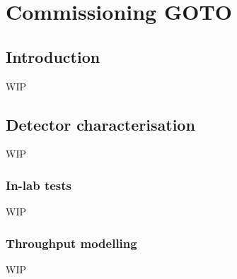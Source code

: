 \chapter{Commissioning GOTO}
\label{chap:commissioning}
\chaptoc{}


\newpage
\section{Introduction}
\label{sec:commissioning_intro}
\begin{colsection}


\begin{colsection}

WIP

\end{colsection}


\end{colsection}


\newpage
\section{Detector characterisation}
\label{sec:detectors}
\begin{colsection}


\begin{colsection}

WIP

\end{colsection}

\subsection{In-lab tests}
\label{sec:detector_tests}
\begin{colsection}

WIP

\end{colsection}

\subsection{Throughput modelling}
\label{sec:throughput}
\begin{colsection}

WIP

\end{colsection}


\end{colsection}

